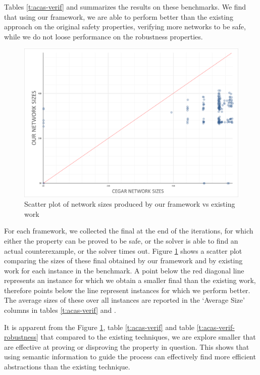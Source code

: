 Tables \ref{t:acas-verif} and \label{t:acas-verif-robustness} summarizes the
results on these benchmarks. We
find that using our framework, we are able to perform better than the existing
\cegar approach \cite{cegar-nn} on the original safety properties, verifying
more networks to be safe, while we do not loose performance on the robustness
properties. 

\begin{figure}
    \vspace*{-0.5cm}
    \includegraphics[scale=0.2]{figs/scatter-cegar-our-nerualsat-diag.png}
    \caption{Scatter plot of network sizes produced by our framework vs existing
    work \cite{cegar-nn}}
    \label{f:scatter-netsizes}
    \vspace*{-0.5cm}
\end{figure}

For each framework, we collected the final \abs at the end of the \cegar
iterations, for which either the property can be proved to be safe, or 
the solver is able to find an actual counterexample, or the solver times out.  
Figure \ref{f:scatter-netsizes} shows a scatter plot comparing the sizes of
these final \abs obtained by our framework and by existing work \cite{cegar-nn}
for each instance in the benchmark.
A point below the red diagonal line represents an instance for which we obtain a
smaller final \abs than the existing work, therefore points below the line
represent instances for which we perform better.
The average sizes of these \abs over all instances are
reported in the `Average Size' columns in tables \ref{t:acas-verif} and
\label{t:acas-verif-robustness}. 

It is apparent from the Figure \ref{f:scatter-netsizes}, 
table \ref{t:acas-verif} and table \ref{t:acas-verif-robustness} that compared 
to the existing techniques, we are explore smaller \abs that are effective 
at proving or disproving the property in question.
This shows that using semantic information to guide the \cegar process can
effectively find more efficient abstractions than the existing technique.

